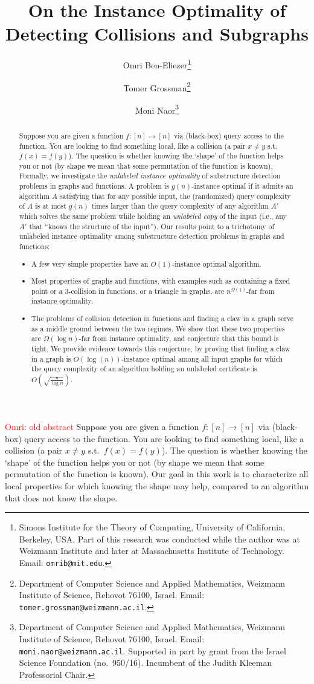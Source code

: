 \documentclass[11pt]{article}
\title{On the Instance Optimality of Detecting Collisions and Subgraphs
}
\author{
Omri Ben-Eliezer\thanks{Simons Institute for the Theory of Computing, University of California, Berkeley, USA. Part of this research was conducted while the author was at Weizmann Institute and later at Massachusetts Institute of Technology. Email: \texttt{omrib@mit.edu}.}
\and
Tomer Grossman\thanks{Department of Computer Science and Applied Mathematics,
   Weizmann Institute of Science,  Rehovot 76100, Israel. Email: \texttt{tomer.grossman@weizmann.ac.il}.}
\and
 Moni Naor\thanks{Department of Computer Science and Applied Mathematics,
   Weizmann Institute of Science,  Rehovot 76100, Israel. Email:
   \texttt{moni.naor@weizmann.ac.il}. Supported in part by grant  from the Israel
   Science Foundation (no.\ 950/16). Incumbent of the Judith Kleeman Professorial
   Chair.}
}
\date{}
\numberwithin{equation}{section}
\newcommand{\1}{\mathbf{1}}
\newcommand\omri[1]{{\textcolor{red}{Omri: #1}}}
\begin{document}
\maketitle








\begin{abstract}
Suppose you are given a function 
$f\colon [n] \to [n]$
via (black-box) query access to the function. You are looking to find something local, like a collision (a pair $x \neq y$ s.t.\ $f(x)=f(y)$). The question is whether knowing the `shape' of the function helps you or not (by  shape we mean that some permutation of the function is known). 
Formally, we investigate the \emph{unlabeled instance optimality} of substructure detection problems in graphs and functions. A problem is $g(n)$-instance optimal if it admits an algorithm 
$A$ satisfying that for any possible input, the (randomized) query complexity of $A$ is at most $g(n)$ times larger than the query complexity of any algorithm $A'$ which solves the same problem while holding an \emph{unlabeled copy} of the input (i.e., any $A'$ that ``knows the structure of the input''). 
Our results point to a trichotomy of unlabeled instance optimality among substructure detection problems in graphs and functions: 
\begin{itemize}
\item A few very simple properties have an $O(1)$-instance optimal algorithm.
\item Most properties of graphs and functions, with examples such as containing a fixed point or a $3$-collision in functions, or a triangle in graphs, are $n^{\Omega(1)}$-far from instance optimality. 
\item The problems of collision detection in functions and finding a claw in a graph serve as a middle ground between the two regimes. 
We show that these two properties are $\Omega(\log n)$-far from instance optimality, and conjecture that this bound is tight. We provide evidence towards this conjecture, by proving that finding a claw in a graph is $O(\log(n))$-instance optimal among all input graphs for which the query complexity of an algorithm holding an unlabeled certificate is $O\left(\sqrt{\frac{n}{\log n}}\right)$.
\end{itemize}
\end{abstract}


\iffalse
\omri{old abstract}
Suppose you are given a function 
$f\colon [n] \to [n]$
via (black-box) query access to the function. You are looking to find something local, like a collision (a pair $x \neq y$ s.t.\ $f(x)=f(y)$). The question is whether knowing the `shape' of the function helps you or not (by  shape we mean that some permutation of the function is known). Our goal in this work is to characterize all local properties for which knowing the shape may help, compared to an algorithm that does not know the shape. 
\end{document}
